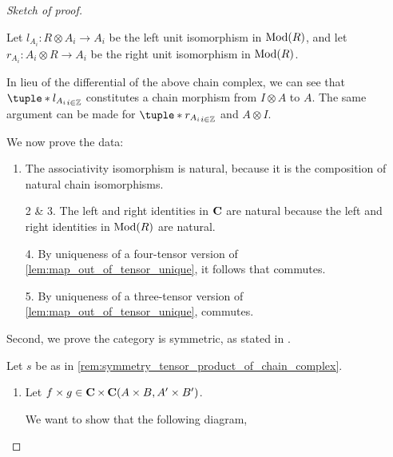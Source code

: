 \begin{proof}[Sketch of proof]
\begin{enumerate}
{            Let \( l_{A_i}: R \otimes A_i \to A_i \) be the left unit isomorphism in \( \operatorname{Mod}(R) \), and let \( r_{A_i}: A_i \otimes R \to A_i \) be the right unit isomorphism in \( \operatorname{Mod}(R) \).

            In lieu of the differential of the above chain complex, we can see that \( \tuple*{l_{A_i}}_{i \in \Zb} \) constitutes a chain morphism from \( I \otimes A \) to \( A \). The same argument can be made for \( \tuple*{r_{A_i}}_{i \in \Zb} \) and \( A \otimes I \).
        }
    \end{enumerate}
    We now prove the data:
    \begin{enumerate}
        \item {
            The associativity isomorphism is natural, because it is the composition of natural chain isomorphisms. 
        }
        \item[2 \& 3.] {
            The left and right identities in \( \operatorname{\mathbf{C}} \) are natural because the left and right identities in \( \operatorname{Mod}(R) \) are natural.
        }
        \item[4.] {
            By uniqueness of a four-tensor version of \autoref{lem:map_out_of_tensor_unique}, it follows that \cite[Diagram 6.1]{Borceux_1994} commutes.
        }
        \item[5.] {
            By uniqueness of a three-tensor version of \autoref{lem:map_out_of_tensor_unique}, \cite[Diagram 6.2]{Borceux_1994} commutes.
        }
    \end{enumerate}

    Second, we prove the category is symmetric, as stated in \cite[Definition 6.1.2]{Borceux_1994}.

    Let \( s \) be as in \autoref{rem:symmetry_tensor_product_of_chain_complex}.

    \begin{enumerate}
        \item {
            Let \( f \times g \in \operatorname{\mathbf{C}} \times \operatorname{\mathbf{C}} (A \times B, A' \times B') \).

            We want to show that the following diagram,
            \begin{center}
\end{center}}
\end{enumerate}
\end{proof}
